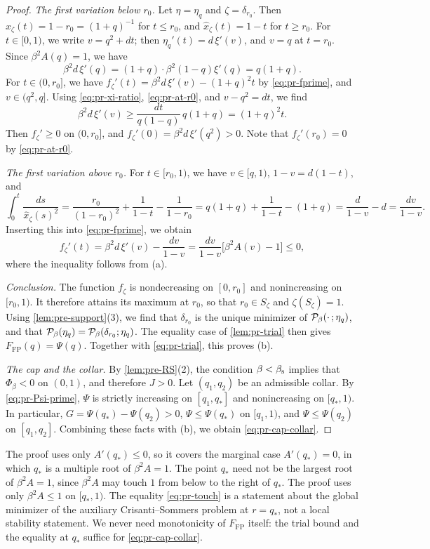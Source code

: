 \begin{proof}
\emph{The first variation below $r_0$.} Let $\eta=\eta_q$ and $\zeta=\delta_{r_0}$. Then $\hat x_\zeta(t)=1-r_0=(1+q)^{-1}$ for $t\le r_0$, and $\hat x_\zeta(t)=1-t$ for $t\ge r_0$. For $t\in[0,1)$, we write $v=q^2+dt$; then $\eta_q'(t)=d\,\xi'(v)$, and $v=q$ at $t=r_0$. Since $\beta^2A(q)=1$, we have
\begin{equation}\label{eq:pr-at-r0}
\beta^2d\,\xi'(q)=(1+q)\cdot\beta^2(1-q)\xi'(q)=q(1+q).
\end{equation}
For $t\in(0,r_0]$, we have $f_\zeta'(t)=\beta^2d\,\xi'(v)-(1+q)^2t$ by \eqref{eq:pr-fprime}, and $v\in(q^2,q]$. Using \eqref{eq:pr-xi-ratio}, \eqref{eq:pr-at-r0}, and $v-q^2=dt$, we find
\[
\beta^2d\,\xi'(v)\ge\frac{dt}{q(1-q)}\,q(1+q)=(1+q)^2t .
\]
Then $f_\zeta'\ge0$ on $(0,r_0]$, and $f_\zeta'(0)=\beta^2d\,\xi'(q^2)>0$. Note that $f_\zeta'(r_0)=0$ by \eqref{eq:pr-at-r0}.

\emph{The first variation above $r_0$.} For $t\in[r_0,1)$, we have $v\in[q,1)$, $1-v=d(1-t)$, and
\[
\int_0^t\frac{ds}{\hat x_\zeta(s)^2}=\frac{r_0}{(1-r_0)^2}+\frac1{1-t}-\frac1{1-r_0}=q(1+q)+\frac1{1-t}-(1+q)=\frac{d}{1-v}-d=\frac{dv}{1-v}.
\]
Inserting this into \eqref{eq:pr-fprime}, we obtain
\[
f_\zeta'(t)=\beta^2d\,\xi'(v)-\frac{dv}{1-v}=\frac{dv}{1-v}\bigl[\beta^2A(v)-1\bigr]\le0,
\]
where the inequality follows from (a).

\emph{Conclusion.} The function $f_\zeta$ is nondecreasing on $[0,r_0]$ and nonincreasing on $[r_0,1)$. It therefore attains its maximum at $r_0$, so that $r_0\in S_\zeta$ and $\zeta(S_\zeta)=1$. Using \cref{lem:pre-support}(3), we find that $\delta_{r_0}$ is the unique minimizer of $\mathcal P_\beta(\cdot\,;\eta_q)$, and that $\mathcal P_\beta(\eta_q)=\mathcal P_\beta(\delta_{r_0};\eta_q)$. The equality case of \cref{lem:pr-trial} then gives $F_{\mathrm{FP}}(q)=\Psi(q)$. Together with \eqref{eq:pr-trial}, this proves (b).

\emph{The cap and the collar.} By \cref{lem:pre-RS}(2), the condition $\beta<\beta_{\mathrm s}$ implies that $\Phi_\beta<0$ on $(0,1)$, and therefore $J>0$. Let $(q_1,q_2)$ be an admissible collar. By \eqref{eq:pr-Psi-prime}, $\Psi$ is strictly increasing on $[q_1,q_*]$ and nonincreasing on $[q_*,1)$. In particular, $G=\Psi(q_*)-\Psi(q_2)>0$, $\Psi\le\Psi(q_*)$ on $[q_1,1)$, and $\Psi\le\Psi(q_2)$ on $[q_1,q_2]$. Combining these facts with (b), we obtain \eqref{eq:pr-cap-collar}.
\end{proof}

\begin{remark}\label{rem:pr-certificate}
The proof uses only $A'(q_*)\le0$, so it covers the marginal case $A'(q_*)=0$, in which $q_*$ is a multiple root of $\beta^2A=1$. The point $q_*$ need not be the largest root of $\beta^2A=1$, since $\beta^2A$ may touch $1$ from below to the right of $q_*$. The proof uses only $\beta^2A\le1$ on $[q_*,1)$. The equality \eqref{eq:pr-touch} is a statement about the global minimizer of the auxiliary Crisanti--Sommers problem at $r=q_*$, not a local stability statement. We never need monotonicity of $F_{\mathrm{FP}}$ itself: the trial bound and the equality at $q_*$ suffice for \eqref{eq:pr-cap-collar}.
\end{remark}


